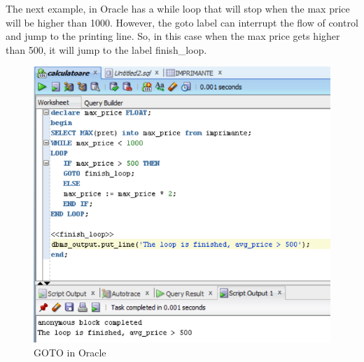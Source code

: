 \begin{itemize}
The next example, in Oracle has a while loop that will stop when the max price will be higher than 1000. However, the goto label can interrupt the flow of control and jump to the printing line. So, in this case when the max price gets higher than 500, it will jump to the label finish\_loop.
 \begin{figure}[ht!]
    \centering
    \includegraphics{images/example7a-goto.png}
    \caption{GOTO in Oracle}
    \label{fig1}
\end{figure}


\end{itemize}
\clearpage